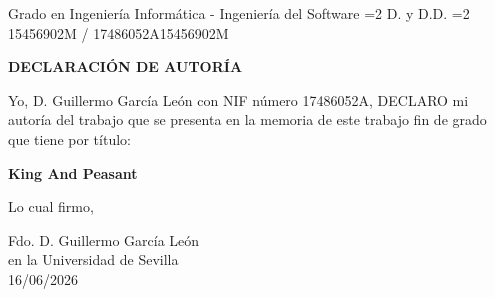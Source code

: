 \documentclass[titlepage,openright,twoside,a4paper,final,12pt,spanish]{book}
\begin{document}
\author{\ifnum\value{page}<3 Ismael Carrasco Mkhazni y Guillermo García León\else Ismael Carrasco Mkhazni\fi}
       {Grado en Ingeniería Informática - Ingeniería del Software}
       {\ifnum\value{page}=2 D. y D.\else D. \fi}
       {\ifnum\value{page}=2 15456902M / 17486052A\else 15456902M\fi}


\makeTitlePage

\clearpage
\thispagestyle{empty}

\vspace*{2cm}
\begin{center}
    {\Large \bfseries DECLARACIÓN DE AUTORÍA}
\end{center}
\vspace{1cm}

Yo, D. Guillermo García León con NIF número 17486052A, DECLARO mi autoría del trabajo que se presenta en la memoria de este trabajo fin de grado que tiene por título:

\begin{center}
    \vspace{0.5cm}
    {\large \bfseries King And Peasant}
    \vspace{0.5cm}
\end{center}

Lo cual firmo,

\vspace{2cm}
\begin{flushright}
    Fdo. D. Guillermo García León \\
    en la Universidad de Sevilla \\
    16/06/2026
\end{flushright}

\pagestyle{trinidadPhD}





\tableofcontents
\listoffigures
\listoftables
\newpage


\end{document}
